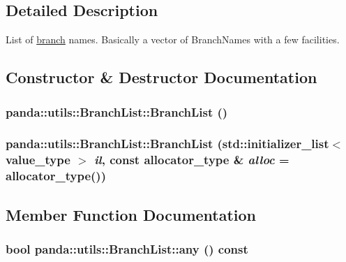 \subsection{Detailed Description}
List of \hyperlink{namespacepanda_1_1branch}{branch} names. Basically a vector of BranchNames with a few facilities. 

\subsection{Constructor \& Destructor Documentation}
\hypertarget{classpanda_1_1utils_1_1BranchList_a3902851c681dcd533d78c62c85d8e1eb}{
\subsubsection[{BranchList}]{\setlength{\rightskip}{0pt plus 5cm}panda::utils::BranchList::BranchList ()}}
\label{classpanda_1_1utils_1_1BranchList_a3902851c681dcd533d78c62c85d8e1eb}
\hypertarget{classpanda_1_1utils_1_1BranchList_a0dfdfc0bac1a7e53dbcaccca50ed6027}{
\subsubsection[{BranchList}]{\setlength{\rightskip}{0pt plus 5cm}panda::utils::BranchList::BranchList (std::initializer\_\-list$<$ value\_\-type $>$ {\em il}, \/  const allocator\_\-type \& {\em alloc} = {\ttfamily allocator\_\-type()})}}
\label{classpanda_1_1utils_1_1BranchList_a0dfdfc0bac1a7e53dbcaccca50ed6027}


\subsection{Member Function Documentation}
\hypertarget{classpanda_1_1utils_1_1BranchList_aead8646065a2422c246b8d04f66dd00d}{
\subsubsection[{any}]{\setlength{\rightskip}{0pt plus 5cm}bool panda::utils::BranchList::any () const}}
\label{classpanda_1_1utils_1_1BranchList_aead8646065a2422c246b8d04f66dd00d}


